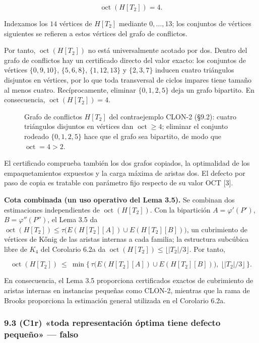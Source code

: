 \documentclass[spanish,11pt,a4paper]{article}
\begin{document}
\[
\operatorname{oct}(H[T_2])=4.
\]

Indexamos los \(14\) vértices de \(H[T_2]\) mediante \(0,\dots,13\); los
conjuntos de vértices siguientes se refieren a estos vértices del grafo
de conflictos.

Por tanto, \(\operatorname{oct}(H[T_2])\) no está universalmente acotado
por dos. Dentro del grafo de conflictos hay un certificado directo del
valor exacto: los conjuntos de vértices \(\{0,9,10\}\), \(\{5,6,8\}\),
\(\{1,12,13\}\) y \(\{2,3,7\}\) inducen cuatro triángulos disjuntos en
vértices, por lo que toda transversal de ciclos impares tiene tamaño al
menos cuatro. Recíprocamente, eliminar \(\{0,1,2,5\}\) deja un grafo
bipartito. En consecuencia, \(\operatorname{oct}(H[T_2])=4\).

\begin{figure}[H]
\centering

\caption{Grafo de conflictos \(H[T_2]\) del contraejemplo CLON-2 (§9.2): cuatro triángulos disjuntos en vértices dan \(\operatorname{oct}\ge4\); eliminar el conjunto rodeado \(\{0,1,2,5\}\) hace que el grafo sea bipartito, de modo que \(\operatorname{oct}=4>2\).}
\label{fig:paper-v-3}
\end{figure}

El certificado comprueba también los dos grafos copiados, la optimalidad
de los empaquetamientos expuestos y la carga máxima de aristas dos. El
defecto por paso de copia es tratable con parámetro fijo respecto de su
valor OCT {[}3{]}.

\textbf{Cota combinada (un uso operativo del Lema 3.5).} Se combinan dos
estimaciones independientes de \(\operatorname{oct}(H[T_2])\). Con la
bipartición \(A=\varphi'(P')\), \(B=\varphi''(P'')\), el Lema 3.5 da
\(\operatorname{oct}(H[T_2])\le\tau\!\big(E(H[T_2][A])\cup E(H[T_2][B])\big)\),
un cubrimiento de vértices de Kőnig de las aristas internas a cada
familia; la estructura subcúbica libre de \(K_4\) del Corolario 6.2a da
\(\operatorname{oct}(H[T_2])\le\lfloor|T_2|/3\rfloor\). Por tanto,

\[
\operatorname{oct}(H[T_2])\ \le\ \min\Big\{\,\tau\!\big(E(H[T_2][A])\cup E(H[T_2][B])\big),\ \big\lfloor|T_2|/3\big\rfloor\,\Big\}.
\]

En consecuencia, el Lema 3.5 proporciona certificados exactos de
cubrimiento de aristas internas en instancias pequeñas como CLON-2,
mientras que la rama de Brooks proporciona la estimación general
utilizada en el Corolario 6.2a.

\subsubsection{9.3 (C1r) «toda representación óptima tiene defecto
pequeño» ---
falso}\label{c1r-toda-representaciuxf3n-uxf3ptima-tiene-defecto-pequeuxf1o-falso}
\end{document}
